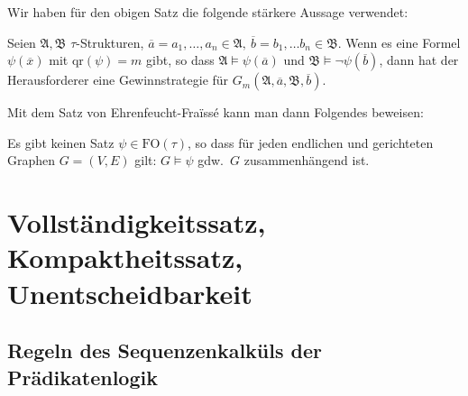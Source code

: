 \documentclass{panikzettel}
\newcommand{\A}{\mathfrak{A}}
\newcommand{\B}{\mathfrak{B}}
\newcommand{\FO}{\mathrm{FO}}
\newcommand{\qr}{\mathrm{qr}}
\begin{document}
Wir haben für den obigen Satz die folgende stärkere Aussage verwendet:

Seien $\A, \B$ $\tau$-Strukturen, $\overline{a} = a_1, \ldots, a_n \in \A,\ \overline{b} = b_1, \ldots b_n \in \B$. Wenn es eine Formel $\psi(\overline{x})$ mit $\qr(\psi) = m$ gibt, so dass $\A \models \psi(\overline{a})$ und $\B \models \neg \psi(\overline{b})$, dann hat der Herausforderer eine Gewinnstrategie für $G_m(\A, \overline{a}, \B, \overline{b})$.

Mit dem Satz von Ehrenfeucht-Fra\"issé kann man dann Folgendes beweisen:

Es gibt keinen Satz $\psi \in \FO(\tau)$, so dass für jeden endlichen und gerichteten Graphen $G = (V, E)$ gilt: $G \models \psi$ gdw.\ $G$ zusammenhängend ist.

\section{Vollständigkeitssatz, Kompaktheitssatz, Unentscheidbarkeit}

\subsection{Regeln des Sequenzenkalküls der Prädikatenlogik}
\end{document}
